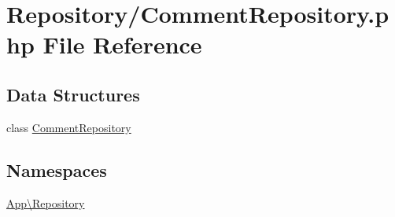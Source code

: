 \hypertarget{_comment_repository_8php}{}\section{Repository/\+Comment\+Repository.php File Reference}
\label{_comment_repository_8php}
\subsection*{Data Structures}
\begin{DoxyCompactItemize}
\item 
class \mbox{\hyperlink{class_app_1_1_repository_1_1_comment_repository}{Comment\+Repository}}
\end{DoxyCompactItemize}
\subsection*{Namespaces}
\begin{DoxyCompactItemize}
\item 
 \mbox{\hyperlink{namespace_app_1_1_repository}{App\textbackslash{}\+Repository}}
\end{DoxyCompactItemize}
